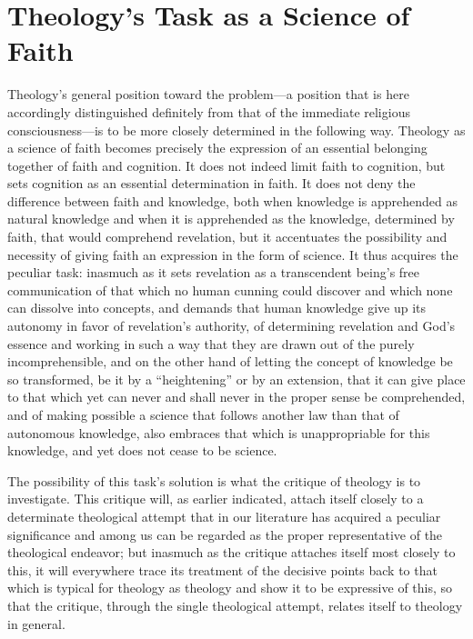 \documentclass[12pt,a4paper]{book}
\begin{document}
\section{Theology's Task as a Science of Faith}
\label{sec:science-of-faith}

Theology's general position toward the problem---a position that is here
accordingly distinguished definitely from that of the immediate religious
consciousness---is to be more closely determined in the following way. Theology
as a science of faith becomes precisely the expression of an essential belonging
together of faith and cognition. It does not indeed limit faith to cognition, but
sets cognition as an essential determination in faith. It does not deny the
difference between faith and knowledge, both when knowledge is apprehended as
natural knowledge and when it is apprehended as the knowledge, determined by
faith, that would comprehend revelation, but it accentuates the possibility and
necessity of giving faith an expression in the form of science. It thus acquires
the peculiar task: inasmuch as it sets revelation as a transcendent being's free
communication of that which no human cunning could discover and which none can dissolve
into concepts, and demands that human knowledge give up its autonomy in favor of
revelation's authority, of determining revelation and God's essence and working
in such a way that they are drawn out of the purely incomprehensible, and on the
other hand of letting the concept of knowledge be so transformed, be it by a
``heightening'' or by an extension, that it can give place to that which yet can
never and shall never in the proper sense be comprehended, and of making possible
a science that follows another law than that of autonomous knowledge, also
embraces that which is unappropriable for this knowledge, and yet does not cease
to be science.

The possibility of this task's solution is what the critique of theology is to
investigate. This critique will, as earlier indicated, attach itself closely to a
determinate theological attempt that in our literature has acquired a peculiar
significance and among us can be regarded as the proper representative of the
theological endeavor; but inasmuch as the critique attaches itself most closely
to this, it will everywhere trace its treatment of the decisive points back to
that which is typical for theology as theology and show it to be expressive of
this, so that the critique, through the single theological attempt, relates
itself to theology in general.
\end{document}

